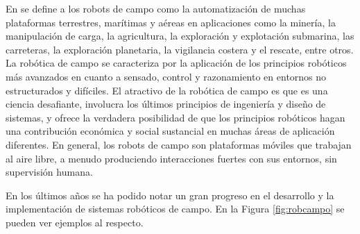 En \cite{thorpe2003field} se define a los robots de campo como la automatización de muchas plataformas terrestres, marítimas y aéreas en aplicaciones como la minería, la manipulación de carga, la agricultura, la exploración y explotación submarina, las carreteras, la exploración planetaria, la vigilancia costera y el rescate, entre otros. La robótica de campo se caracteriza por la aplicación de los principios robóticos más avanzados en cuanto a sensado, control y razonamiento en entornos no estructurados y difíciles. El atractivo de la robótica de campo es que es una ciencia desafiante, involucra los últimos principios de ingeniería y diseño de sistemas, y ofrece la verdadera posibilidad de que los principios robóticos hagan una contribución económica y social sustancial en muchas áreas de aplicación diferentes. En general, los robots de campo son plataformas móviles que trabajan al aire libre, a menudo produciendo interacciones fuertes con sus entornos, sin supervisión humana.

En los últimos años se ha podido notar un gran progreso en el desarrollo y la implementación de sistemas robóticos de campo. En la Figura \ref{fig:robcampo} se pueden ver ejemplos al respecto. \\


